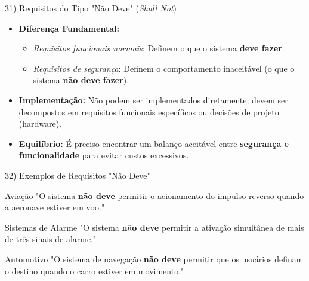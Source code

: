 \documentclass[aspectratio=169]{beamer}
\begin{document}
\begin{frame}{31) Requisitos do Tipo "Não Deve" (\textit{Shall Not})}
  \begin{itemize}
    \item \textbf{Diferença Fundamental:}
    \begin{itemize}
      \item \textit{Requisitos funcionais normais}: Definem o que o sistema \textbf{deve fazer}.
      \item \textit{Requisitos de segurança}: Definem o comportamento \alert{inaceitável} (o que o sistema \textbf{não deve fazer}).
    \end{itemize}
    \item \textbf{Implementação:} Não podem ser implementados diretamente; devem ser decompostos em requisitos funcionais específicos ou decisões de projeto (hardware).
    \item \textbf{Equilíbrio:} É preciso encontrar um balanço aceitável entre \textbf{segurança e funcionalidade} para evitar custos excessivos.
  \end{itemize}
\end{frame}

\begin{frame}{32) Exemplos de Requisitos "Não Deve"}
  \begin{exampleblock}{Aviação}
    "O sistema \textbf{não deve} permitir o acionamento do impulso reverso quando a aeronave estiver em voo."
  \end{exampleblock}
  \vspace{0.4em}
  \begin{exampleblock}{Sistemas de Alarme}
    "O sistema \textbf{não deve} permitir a ativação simultânea de mais de três sinais de alarme."
  \end{exampleblock}
  \vspace{0.4em}
  \begin{exampleblock}{Automotivo}
    "O sistema de navegação \textbf{não deve} permitir que os usuários definam o destino quando o carro estiver em movimento."
  \end{exampleblock}
\end{frame}
\end{document}
